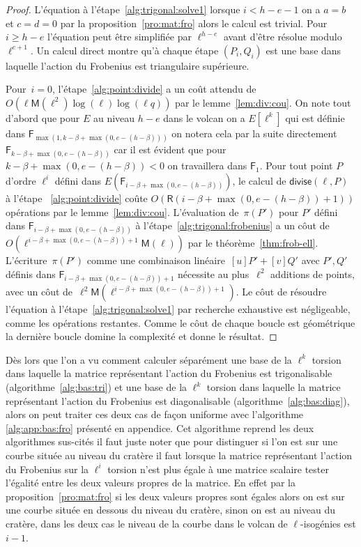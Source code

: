 \documentclass[10pt,a4paper]{book}
\theoremstyle{plain}
\theoremstyle{definition}
\theoremstyle{definition}
\theoremstyle{definition}
\theoremstyle{definition}
\theoremstyle{remark}
\theoremstyle{remark}
\theoremstyle{definition}
\begin{document}
\begin{proof}
L'équation à l'étape~\ref{alg:trigonal:solve1} lorsque $i<h-e-1$ on a $a=b$ et 
$c=d=0$ par la proposition~\ref{pro:mat:fro} alors le calcul est trivial. Pour 
$i \geqslant h-e$ l'équation peut être simplifiée par  $\ell^{h-e}$ avant 
d'être résolue modulo $\ell^{e+1}$. Un calcul direct montre qu'à chaque étape 
$(P_i,Q_i)$ est une base dans laquelle l'action du Frobenius est triangulaire 
supérieure. 


Pour~$i = 0$, l'étape~\ref{alg:point:divide} a
 un coût attendu de $O(\ell \mathsf{M}(\ell^2)\log(\ell)\log(\ell q))$
par le lemme~\ref{lem:div:cou}.
On note tout d'abord que pour $E$ au niveau $h-e$ dans le volcan on a 
$E[\ell^{k}]$ qui est définie dans $\mathsf{F}_{\max(1,k-\beta+\max(0,e-(h-
\beta)))}$ on notera cela par la suite directement $\mathsf{F}_{k-\beta+\max(0,e-(h-
\beta))}$ car il est évident que pour $k-\beta+\max(0,e-(h-\beta)) <0$ on 
travaillera dans $\mathsf{F}_{1}$. 
Pour tout point $P$ d'ordre  $\ell^i$ défini dans 
$E(\mathsf{F}_{i-\beta+\max(0,e-(h-\beta))})$, le calcul de $\mathsf{divise}(\ell, P)$ à 
 l'étape ~\ref{alg:point:divide} coûte $O(\mathsf{R}(i-\beta+\max(0,e-(h-\beta))+1))$ opérations 
 par le lemme~\ref{lem:div:cou}.
  L'évaluation de~$\pi(P')$ pour $P'$ défini dans $\mathsf{F}_{i-\beta+\max(0,e-(h-\beta))}$ à
   l'étape~\ref{alg:trigonal:frobenius} a un côut
  de~$O(\ell^{i-\beta+\max(0,e-(h-\beta))+1}\mathsf{M}(\ell))$ par le théorème~\ref{thm:frob-ell}.
  L'écriture~$\pi(P')$ comme une combinaison linéaire~$[u] P' + [v] Q'$ avec 
  $P',Q'$ définis dans $\mathsf{F}_{i-\beta+\max(0,e-(h-\beta))+1}$ nécessite au
  plus~$\ell^2$ additions de points, avec un côut de~$\ell^2
  \mathsf{M}(\ell^{i-\beta+\max(0,e-(h-\beta))+1})$.
  Le côut de résoudre l'équation à l'étape~\ref{alg:trigonal:solve1}
  par recherche exhaustive est négligeable, comme les 
  opérations restantes. Comme le côut de chaque boucle est géométrique
  la dernière boucle domine la complexité et donne le résultat.
\end{proof}

Dès lors que l'on a vu comment calculer séparément une base de la $\ell^k$ 
torsion dans laquelle la matrice représentant l'action du Frobenius est 
trigonalisable (algorithme~\ref{alg:bas:tri}) et une base de la $\ell^k$ 
torsion dans laquelle la matrice représentant l'action du Frobenius est 
diagonalisable (algorithme~\ref{alg:bas:diag}), alors on peut traiter ces deux 
cas de façon uniforme avec l'algorithme \ref{alg:app:bas:fro} présenté en 
appendice. Cet algorithme reprend les deux algorithmes sus-cités il faut juste 
noter que pour distinguer si l'on est sur une courbe située au niveau du 
cratère il faut lorsque la matrice représentant l'action du Frobenius sur la 
$\ell^i$ torsion n'est plus égale à une matrice scalaire tester l'égalité entre
 les deux valeurs propres de la matrice. En effet par la 
 proposition~\ref{pro:mat:fro}  si les deux valeurs propres sont égales alors 
 on est sur une courbe située en dessous du niveau du cratère, sinon on est au 
 niveau du cratère, dans les deux cas le niveau de la courbe dans le volcan de 
 $\ell$-isogénies est $i-1$.
\end{document}
